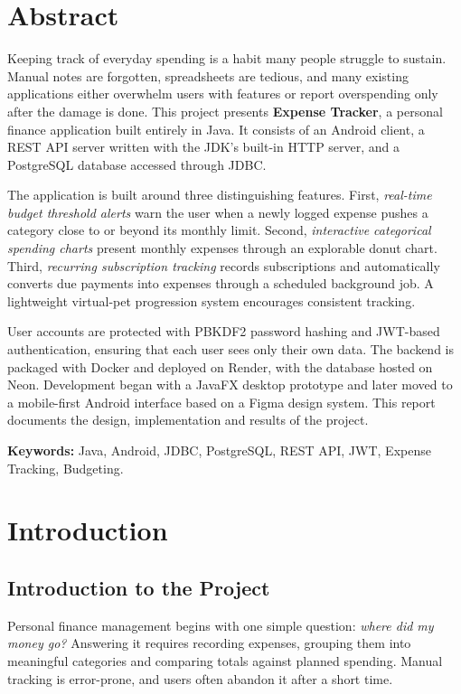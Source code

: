 \documentclass[12pt,a4paper]{report}
\begin{document}
\setcounter{page}{1}
\chapter*{Abstract}
Keeping track of everyday spending is a habit many people struggle to sustain. Manual notes are forgotten, spreadsheets are tedious, and many existing applications either overwhelm users with features or report overspending only after the damage is done. This project presents \textbf{Expense Tracker}, a personal finance application built entirely in Java. It consists of an Android client, a REST API server written with the JDK's built-in HTTP server, and a PostgreSQL database accessed through JDBC.

The application is built around three distinguishing features. First, \emph{real-time budget threshold alerts} warn the user when a newly logged expense pushes a category close to or beyond its monthly limit. Second, \emph{interactive categorical spending charts} present monthly expenses through an explorable donut chart. Third, \emph{recurring subscription tracking} records subscriptions and automatically converts due payments into expenses through a scheduled background job. A lightweight virtual-pet progression system encourages consistent tracking.

User accounts are protected with PBKDF2 password hashing and JWT-based authentication, ensuring that each user sees only their own data. The backend is packaged with Docker and deployed on Render, with the database hosted on Neon. Development began with a JavaFX desktop prototype and later moved to a mobile-first Android interface based on a Figma design system. This report documents the design, implementation and results of the project.

\medskip
\textbf{Keywords:} Java, Android, JDBC, PostgreSQL, REST API, JWT, Expense Tracking, Budgeting.
\clearpage

\tableofcontents\clearpage
{}\setcounter{page}{1}
\chapter{Introduction}
\section{Introduction to the Project}
Personal finance management begins with one simple question: \emph{where did my money go?} Answering it requires recording expenses, grouping them into meaningful categories and comparing totals against planned spending. Manual tracking is error-prone, and users often abandon it after a short time.
\end{document}
